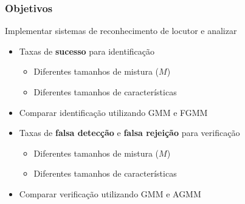 \begin{frame}
\frametitle{Objetivos}
\begin{description}
    \item Implementar sistemas de reconhecimento de locutor e analizar
    \pause
    \begin{itemize}
        \item Taxas de \textbf{sucesso} para identificação
        \pause
        \begin{itemize}
            \item Diferentes tamanhos de mistura ($M$)
            \pause
            \item Diferentes tamanhos de características
            \pause
        \end{itemize}
        \item Comparar identificação utilizando GMM e FGMM
        \pause
        \item Taxas de \textbf{falsa detecção} e \textbf{falsa rejeição} para verificação
        \pause
        \begin{itemize}
            \item Diferentes tamanhos de mistura ($M$)
            \pause
            \item Diferentes tamanhos de características
            \pause
        \end{itemize}
        \item Comparar verificação utilizando GMM e AGMM
    \end{itemize}
\end{description}
\end{frame}